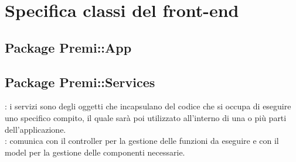 \section {Specifica classi del front-end}
\subsection{Package Premi::App}

\subsection {Package Premi::Services}
\label{sec:services}
\textbf{\tipo}: i servizi sono degli oggetti che incapsulano del codice che si occupa di eseguire uno specifico compito, il quale sarà poi utilizzato all’interno di una o più parti dell’applicazione.\\
\textbf{\relaz}: comunica con il controller per la gestione delle funzioni da eseguire e con il model per la gestione delle componenti necessarie.\\
